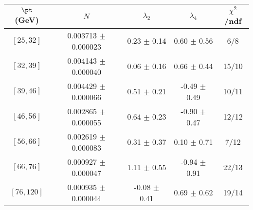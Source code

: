 \begin{tabular}{c||c|c|c|c}
$\pt$ (GeV) & $N$ & $\lambda_{2}$ & $\lambda_4$  & $\chi^2$/ndf  \\
\hline
$[25, 32]$ & 0.003713 $\pm$ 0.000023 & 0.23 $\pm$ 0.14 & 0.60 $\pm$ 0.56 & 6/8\\
$[32, 39]$ & 0.004143 $\pm$ 0.000040 & 0.06 $\pm$ 0.16 & 0.66 $\pm$ 0.44 & 15/10\\
$[39, 46]$ & 0.004429 $\pm$ 0.000066 & 0.51 $\pm$ 0.21 & -0.49 $\pm$ 0.49 & 10/11\\
$[46, 56]$ & 0.002865 $\pm$ 0.000055 & 0.64 $\pm$ 0.23 & -0.90 $\pm$ 0.47 & 12/12\\
$[56, 66]$ & 0.002619 $\pm$ 0.000083 & 0.31 $\pm$ 0.37 & 0.10 $\pm$ 0.71 & 7/12\\
$[66, 76]$ & 0.000927 $\pm$ 0.000047 & 1.11 $\pm$ 0.55 & -0.94 $\pm$ 0.91 & 22/13\\
$[76, 120]$ & 0.000935 $\pm$ 0.000044 & -0.08 $\pm$ 0.41 & 0.69 $\pm$ 0.62 & 19/14\\
\end{tabular}
